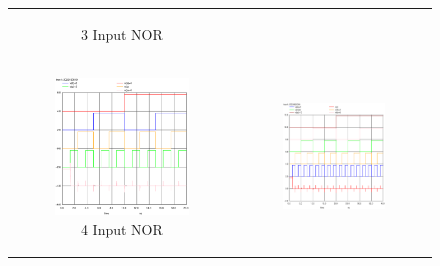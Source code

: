 \documentclass[conference]{IEEEtran}
\begin{document}
\begin{figure}[H]
\begin{tabular}{cc}
\begin{subfigure}{0.44\linewidth}
            \caption{3 Input NOR}
        \end{subfigure} \\
        \begin{subfigure}{0.44\linewidth}
            \centering
            \includegraphics[width=\textwidth]{images/nor_4_cmos_tran.eps}
            \caption{4 Input NOR}
        \end{subfigure} &
        \begin{subfigure}{0.44\linewidth}
            \centering
            \includegraphics[width=\textwidth]{images/nor_5_cmos_tran.eps}

\end{subfigure}
\end{tabular}
\end{figure}
\end{document}
